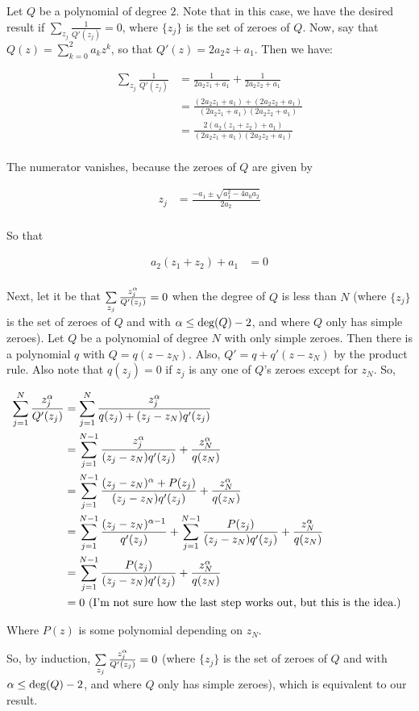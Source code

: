 \documentclass[a4paper,12pt]{article}
\begin{document}
Let $Q$ be a polynomial of degree $2$. Note that in this case, we have the desired result if $\sum\limits_{z_j} \frac{1}{Q'(z_j)} = 0$, where $\{z_j\}$ is the set of zeroes of $Q$. Now, say that $Q(z) = \sum\limits_{k=0}^2 a_kz^k$, so that $Q'(z) = 2a_2 z + a_1$. Then we have:

\begin{align*}
\sum\limits_{z_j} \frac{1}{Q'(z_j)} &=\frac{1}{2a_2z_1+a_1} + \frac{1}{2a_2z_2+a_1}\\
&=\frac{(2a_2z_1+a_1)+(2a_2z_2+a_1)}{(2a_2z_1+a_1)(2a_2z_2+a_1)} \\
&=\frac{2(a_2(z_1+z_2) + a_1)}{(2a_2z_1+a_1)(2a_2z_2+a_1)} \\
\end{align*}

The numerator vanishes, because the zeroes of $Q$ are given by

\begin{align*}
z_j &= \frac{-a_1 \pm \sqrt{a_1^2 -4a_0a_2}}{2a_2}\\
\end{align*}

So that

\begin{align*}
a_2(z_1+z_2) + a_1 &= 0\\ 
\end{align*}

Next, let it be that $\sum\limits_{z_j} \frac{z_j^\alpha}{Q'(z_j)} = 0$ when the degree of $Q$ is less than $N$ (where $\{z_j\}$ is the set of zeroes of $Q$ and with $\alpha \leq \text{deg}(Q) - 2$, and where $Q$ only has simple zeroes). Let $Q$ be a polynomial of degree $N$ with only simple zeroes. Then there is a polynomial $q$ with $Q = q(z-z_N)$. Also, $Q' = q + q'(z-z_N)$ by the product rule. Also note that $q(z_j) = 0$ if $z_j$ is any one of $Q$'s zeroes except for $z_N$. So,

\begin{align*}
\sum\limits_{j=1}^N \frac{z_j^\alpha}{Q'(z_j)} &= \sum\limits_{j=1}^N \frac{z_j^\alpha}{q(z_j) + (z_j-z_N)q'(z_j)}\\
&= \sum\limits_{j=1}^{N-1} \frac{z_j^\alpha}{(z_j-z_N)q'(z_j)} + \frac{z_N^\alpha}{q(z_N)}\\
&= \sum\limits_{j=1}^{N-1} \frac{(z_j-z_N)^\alpha + P(z_j)}{(z_j-z_N)q'(z_j)} + \frac{z_N^\alpha}{q(z_N)}\\
&= \sum\limits_{j=1}^{N-1} \frac{(z_j-z_N)^{\alpha-1}}{q'(z_j)} + \sum\limits_{j=1}^{N-1} \frac{P(z_j)}{(z_j-z_N)q'(z_j)} + \frac{z_N^\alpha}{q(z_N)}\\
&=\sum\limits_{j=1}^{N-1} \frac{P(z_j)}{(z_j-z_N)q'(z_j)} + \frac{z_N^\alpha}{q(z_N)}\\
&=0 \text{ (I'm not sure how the last step works out, but this is the idea.) }
\end{align*} %

Where $P(z)$ is some polynomial depending on $z_N$.

So, by induction, $\sum\limits_{z_j} \frac{z_j^\alpha}{Q'(z_j)} = 0$ (where $\{z_j\}$ is the set of zeroes of $Q$ and with $\alpha \leq \text{deg}(Q) - 2$, and where $Q$ only has simple zeroes), which is equivalent to our result.

\shunt
\end{document}
